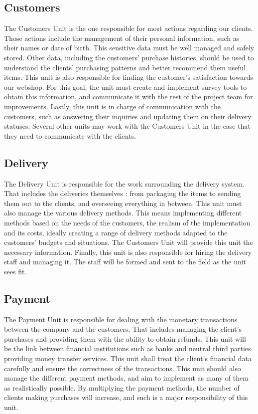 \documentclass{article}
\begin{document}
\subsection{Customers}

The Customers Unit is the one responsible for most actions regarding our clients. Those actions include the management of their personal information, such as their names or date of birth. This sensitive data must be well managed and safely stored. Other data, including the customers' purchase histories, should be used to understand the clients' purchasing patterns and better recommend them useful items. This unit is also responsible for finding the customer's satisfaction towards our webshop. For this goal, the unit must create and implement survey tools to obtain this information, and communicate it with the rest of the project team for improvements. Lastly, this unit is in charge of communication with the customers, such as answering their inquiries and updating them on their delivery statuses. Several other units may work with the Customers Unit in the case that they need to communicate with the clients.

\subsection{Delivery}

The Delivery Unit is responsible for the work surrounding the delivery system. That includes the deliveries themselves : from packaging the items to sending them out to the clients, and overseeing everything in between. This unit must also manage the various delivery methods. This means implementing different methods based on the needs of the customers, the realism of the implementation and its costs, ideally creating a range of delivery methods adapted to the customers' budgets and situations. The Customers Unit will provide this unit the necessary information. Finally, this unit is also responsible for hiring the delivery staff and managing it. The staff will be formed and sent to the field as the unit sees fit.

\subsection{Payment}

The Payment Unit is responsible for dealing with the monetary transactions between the company and the customers. That includes managing the client's purchases and providing them with the ability to obtain refunds. This unit will be the link between financial institutions such as banks and neutral third parties providing money transfer services. This unit shall treat the client's financial data carefully and ensure the correctness of the transactions. This unit should also manage the different payment methods, and aim to implement as many of them as realistically possible. By multiplying the payment methods, the number of clients making purchases will increase, and such is a major responsibility of this unit.
\end{document}
